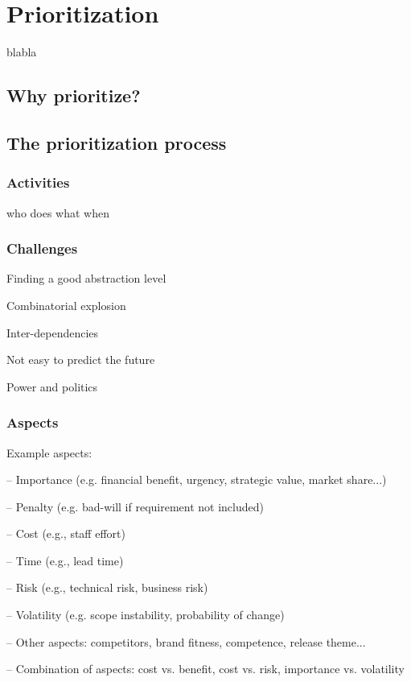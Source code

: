 
\chapter{Prioritization}%
blabla

\section{Why prioritize?}%

\section{The prioritization process}

\subsection{Activities}
who does what when 

\subsection{Challenges}

Finding a good abstraction level

Combinatorial explosion

Inter-dependencies

Not easy to predict the future

Power and politics

\subsection{Aspects}

Example aspects:

-- Importance (e.g. financial benefit, urgency, strategic value, market share...)

--  Penalty (e.g. bad-will if requirement not included)

--  Cost (e.g., staff effort)

--  Time (e.g., lead time)

--  Risk (e.g., technical risk, business risk)

--  Volatility (e.g. scope instability, probability of change)

-- Other aspects: competitors, brand fitness, competence, release theme...

-- Combination of aspects: cost vs. benefit, cost vs. risk, importance vs. volatility

